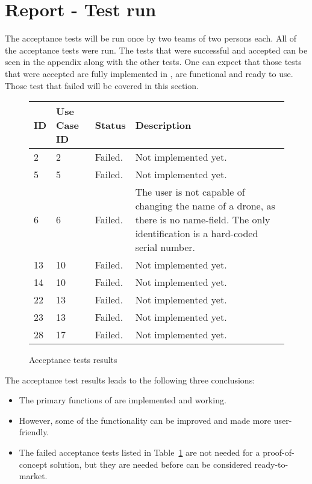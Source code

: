 \section{Report - Test run}
\label{sec:testing_report}

The acceptance tests will be run once by two teams of two persons each. 
All of the acceptance tests were run.
The tests that were successful and accepted can be seen in the appendix along with the other tests.
One can expect that those tests that were accepted are fully implemented in \projectname{}, are functional and ready to use. 
Those test that failed will be covered in this section. \\


\begin{figure}[htb]
\begin{center}
\begin{tabular}{ | l | l | l | p{8cm} | }
  \hline
	\textbf{ID} & \textbf{Use Case ID} & \textbf{Status} & \textbf{Description} \\ \hline
	2 & 2 & Failed. & Not implemented yet. \\ \hline
	5 & 5 & Failed. & Not implemented yet. \\ \hline
	6 & 6 & Failed. & The user is not capable of changing the name of a drone, as there is no name-field. The only identification is a hard-coded serial number. \\ \hline
	13 & 10 & Failed. & Not implemented yet. \\ \hline
	14 & 10 & Failed. & Not implemented yet. \\ \hline
	22 & 13 & Failed. & Not implemented yet. \\ \hline
	23 & 13 & Failed. & Not implemented yet. \\ \hline
	28 & 17 & Failed. & Not implemented yet. \\ \hline
  \hline
\end{tabular}
\caption{Acceptance tests results}
\label{tab:acceptance_tests_results_first_run}
\end{center}
\end{figure}

The acceptance test results leads to the following three conclusions:

\begin{itemize}
	\item The primary functions of \projectname{} are implemented and working. 
	\item However, some of the functionality can be improved and made more user-friendly. 
	\item The failed acceptance tests listed in Table~\ref{tab:acceptance_tests_results_first_run} are not needed for a proof-of-concept solution, but they are needed before \projectname{} can be considered ready-to-market.
\end{itemize}


